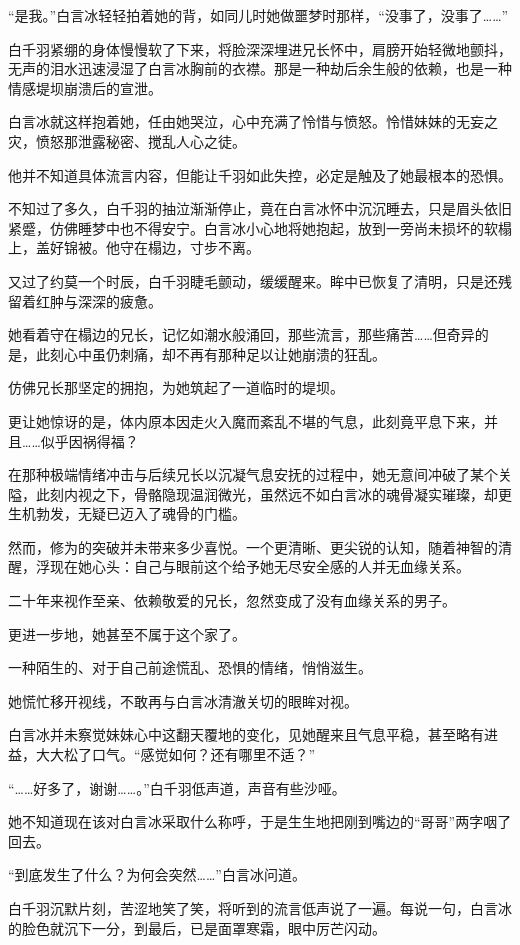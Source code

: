 “是我。”白言冰轻轻拍着她的背，如同儿时她做噩梦时那样，“没事了，没事了……”

白千羽紧绷的身体慢慢软了下来，将脸深深埋进兄长怀中，肩膀开始轻微地颤抖，无声的泪水迅速浸湿了白言冰胸前的衣襟。那是一种劫后余生般的依赖，也是一种情感堤坝崩溃后的宣泄。

白言冰就这样抱着她，任由她哭泣，心中充满了怜惜与愤怒。怜惜妹妹的无妄之灾，愤怒那泄露秘密、搅乱人心之徒。

他并不知道具体流言内容，但能让千羽如此失控，必定是触及了她最根本的恐惧。

不知过了多久，白千羽的抽泣渐渐停止，竟在白言冰怀中沉沉睡去，只是眉头依旧紧蹙，仿佛睡梦中也不得安宁。白言冰小心地将她抱起，放到一旁尚未损坏的软榻上，盖好锦被。他守在榻边，寸步不离。

又过了约莫一个时辰，白千羽睫毛颤动，缓缓醒来。眸中已恢复了清明，只是还残留着红肿与深深的疲惫。

她看着守在榻边的兄长，记忆如潮水般涌回，那些流言，那些痛苦……但奇异的是，此刻心中虽仍刺痛，却不再有那种足以让她崩溃的狂乱。

仿佛兄长那坚定的拥抱，为她筑起了一道临时的堤坝。

更让她惊讶的是，体内原本因走火入魔而紊乱不堪的气息，此刻竟平息下来，并且……似乎因祸得福？

在那种极端情绪冲击与后续兄长以沉凝气息安抚的过程中，她无意间冲破了某个关隘，此刻内视之下，骨骼隐现温润微光，虽然远不如白言冰的魂骨凝实璀璨，却更生机勃发，无疑已迈入了魂骨的门槛。

然而，修为的突破并未带来多少喜悦。一个更清晰、更尖锐的认知，随着神智的清醒，浮现在她心头：自己与眼前这个给予她无尽安全感的人并无血缘关系。

二十年来视作至亲、依赖敬爱的兄长，忽然变成了没有血缘关系的男子。

更进一步地，她甚至不属于这个家了。

一种陌生的、对于自己前途慌乱、恐惧的情绪，悄悄滋生。

她慌忙移开视线，不敢再与白言冰清澈关切的眼眸对视。

白言冰并未察觉妹妹心中这翻天覆地的变化，见她醒来且气息平稳，甚至略有进益，大大松了口气。“感觉如何？还有哪里不适？”

“……好多了，谢谢……。”白千羽低声道，声音有些沙哑。

她不知道现在该对白言冰采取什么称呼，于是生生地把刚到嘴边的“哥哥”两字咽了回去。

“到底发生了什么？为何会突然……”白言冰问道。

白千羽沉默片刻，苦涩地笑了笑，将听到的流言低声说了一遍。每说一句，白言冰的脸色就沉下一分，到最后，已是面罩寒霜，眼中厉芒闪动。

